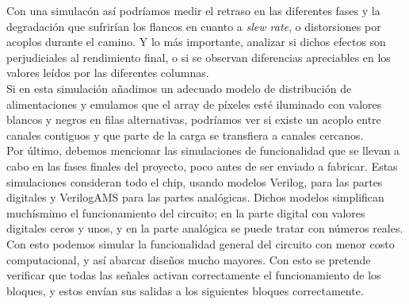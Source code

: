 Con una simulacón así podríamos medir el retraso en las diferentes fases y la
degradación que sufrirían los flancos en cuanto a \textit{slew rate}, o distorsiones
por acoplos durante el camino. Y lo más importante, analizar si dichos efectos
son perjudiciales al rendimiento final, o si se observan diferencias apreciables
en los valores leídos por las diferentes columnas.\\

Si en esta simulación añadimos un adecuado modelo de distribución de alimentaciones
y emulamos que el array de píxeles esté iluminado con valores blancos y negros en
filas alternativas, podríamos ver si existe un acoplo entre canales contiguos y
que parte de la carga se transfiera a canales cercanos.\\

Por último, debemos mencionar las simulaciones de funcionalidad que se llevan
a cabo en las fases finales del proyecto, poco antes de ser enviado a fabricar.
Estas simulaciones consideran todo el chip, usando modelos Verilog, para las partes
digitales y VerilogAMS para las partes analógicas. Dichos modelos simplifican
muchísmimo el funcionamiento del circuito; en la parte digital con valores
digitales ceros y unos, y en la parte analógica se puede tratar con números reales.
Con esto podemos simular la funcionalidad general del circuito con menor costo
computacional, y así abarcar diseños mucho mayores. Con esto se pretende verificar
que todas las señales activan correctamente el funcionamiento de los bloques, y estos
envían sus salidas a los siguientes bloques correctamente.\\
